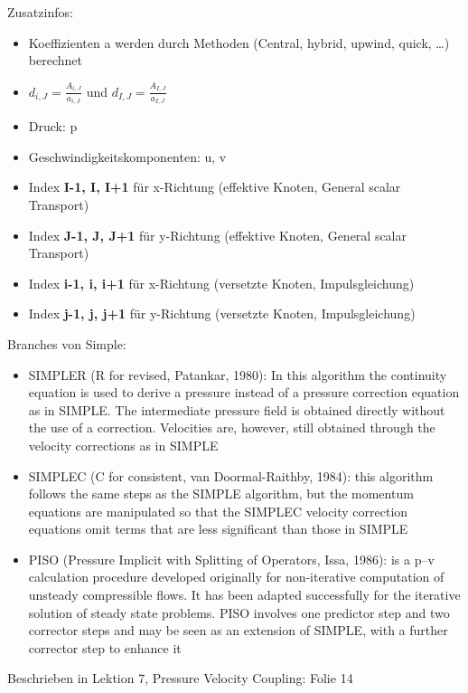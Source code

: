\documentclass[a4paper]{scrartcl}
\begin{document}
Zusatzinfos:\\
\begin{itemize}
  \item Koeffizienten a werden durch Methoden (Central, hybrid, upwind, quick,
  \ldots) berechnet
  \item $d_{i,J} = \frac{A_{i,J}}{a_{i,J}}$ und $d_{I,J} =
  \frac{A_{I,J}}{a_{I,J}}$
  \item Druck: p
  \item Geschwindigkeitskomponenten: u, v
  \item Index \textbf{I-1, I, I+1} für x-Richtung (effektive Knoten, General
  scalar Transport)
  \item Index \textbf{J-1, J, J+1} für y-Richtung (effektive Knoten, General
  scalar Transport)
  \item Index \textbf{i-1, i, i+1} für x-Richtung (versetzte Knoten,
  Impulsgleichung)
  \item Index \textbf{j-1, j, j+1} für y-Richtung (versetzte Knoten,
  Impulsgleichung)
\end{itemize}

Branches von Simple:\\
\begin{itemize}
  \item SIMPLER (R for revised, Patankar, 1980): In this algorithm the
  continuity equation is used to derive a pressure instead of a pressure correction equation as in SIMPLE. The intermediate pressure field is obtained directly without the use of a correction. Velocities are, however, still obtained through the velocity corrections as in SIMPLE
  \item SIMPLEC (C for consistent, van Doormal-Raithby, 1984): this algorithm
  follows the same steps as the SIMPLE algorithm, but the momentum equations are manipulated so that the SIMPLEC velocity correction equations omit terms that are less significant than those in SIMPLE
  \item PISO (Pressure Implicit with Splitting of Operators, Issa, 1986): is a
  p–v calculation procedure developed originally for non-iterative computation of unsteady compressible flows. It has been adapted successfully for the iterative solution of steady state problems. PISO involves one predictor step and two corrector steps and may be seen as an extension of SIMPLE, with a further corrector step to enhance it
\end{itemize}

Beschrieben in Lektion 7, Pressure Velocity Coupling: Folie 14
\end{document}
